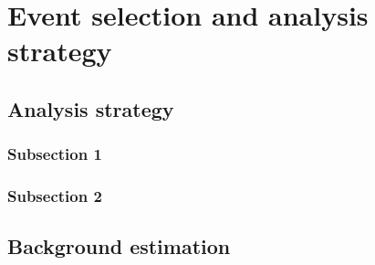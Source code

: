 
\chapter{Event selection and analysis strategy} %

\label{Chapter6} %



\section{Analysis strategy}


\subsection{Subsection 1}




\subsection{Subsection 2}



\section{Background estimation}

